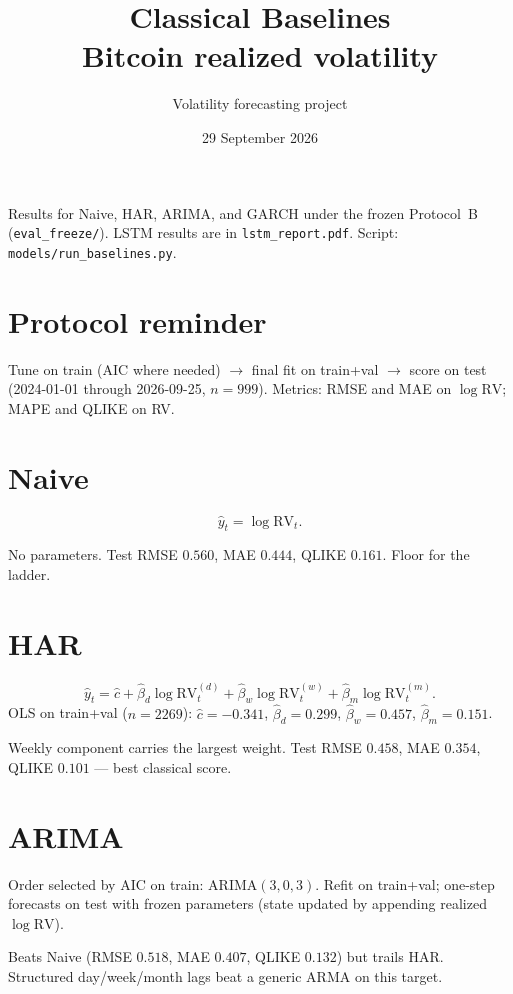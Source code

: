 \documentclass[12pt]{article}
\title{Classical Baselines\\[0.2em]
\large Bitcoin realized volatility}
\author{Volatility forecasting project}
\date{29 September 2026}
\begin{document}
\maketitle

\noindent
Results for Naive, HAR, ARIMA, and GARCH under the frozen Protocol~B
(\texttt{eval\_freeze/}). LSTM results are in \texttt{lstm\_report.pdf}.
Script: \texttt{models/run\_baselines.py}.

\section{Protocol reminder}
Tune on train (AIC where needed) $\rightarrow$ final fit on train+val $\rightarrow$ score on test
(2024-01-01 through 2026-09-25, $n=999$).
Metrics: RMSE and MAE on $\log\mathrm{RV}$; MAPE and QLIKE on RV.

\section{Naive}
\[
\hat y_t=\log\mathrm{RV}_t.
\]
\begin{explain}
No parameters. Test RMSE $0.560$, MAE $0.444$, QLIKE $0.161$. Floor for the ladder.
\end{explain}

\section{HAR}
\[
\hat y_t
=
\hat c
+ \hat\beta_d\log\mathrm{RV}^{(d)}_t
+ \hat\beta_w\log\mathrm{RV}^{(w)}_t
+ \hat\beta_m\log\mathrm{RV}^{(m)}_t.
\]
OLS on train+val ($n=2269$):
$\hat c=-0.341$, $\hat\beta_d=0.299$, $\hat\beta_w=0.457$, $\hat\beta_m=0.151$.
\begin{explain}
Weekly component carries the largest weight. Test RMSE $0.458$, MAE $0.354$, QLIKE $0.101$ --- best classical score.
\end{explain}

\section{ARIMA}
Order selected by AIC on train: ARIMA$(3,0,3)$. Refit on train+val; one-step forecasts on test with frozen parameters (state updated by appending realized $\log\mathrm{RV}$).
\begin{explain}
Beats Naive (RMSE $0.518$, MAE $0.407$, QLIKE $0.132$) but trails HAR. Structured day/week/month lags beat a generic ARMA on this target.
\end{explain}
\end{document}
